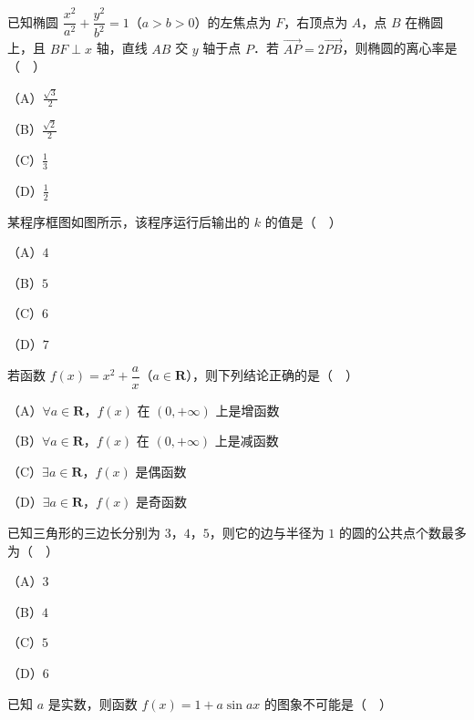 \begin{question}
已知椭圆 $\dfrac{x^2}{a^2}+\dfrac{y^2}{b^2}=1$（$a>b>0$）的左焦点为 $F$，右顶点为 $A$，点 $B$ 在椭圆上，且 $BF\perp x$ 轴，直线 $AB$ 交 $y$ 轴于点 $P$．若 $\overrightarrow{AP}=2\overrightarrow{PB}$，则椭圆的离心率是（　）

（A）$\frac{\sqrt3}{2}$

（B）$\frac{\sqrt2}{2}$

（C）$\frac13$

（D）$\frac12$

\Needspace{0.4\textheight}
\end{question}
\begingroup
\renewenvironment{question}{\Needspace{0.5\textheight}}{}
\begin{question}
某程序框图如图所示，该程序运行后输出的 $k$ 的值是（　）

（A）$4$

（B）$5$

（C）$6$

（D）$7$
\nopagebreak[4]
\begin{center}\end{center}
\nopagebreak[4]
\end{question}
\endgroup
\begin{question}
若函数 $f(x)=x^2+\dfrac ax$（$a\in\mathbf R$），则下列结论正确的是（　）

（A）$\forall a\in\mathbf R$，$f(x)$ 在 $(0,+\infty)$ 上是增函数

（B）$\forall a\in\mathbf R$，$f(x)$ 在 $(0,+\infty)$ 上是减函数

（C）$\exists a\in\mathbf R$，$f(x)$ 是偶函数

（D）$\exists a\in\mathbf R$，$f(x)$ 是奇函数

\end{question}
\begin{question}
已知三角形的三边长分别为 $3$，$4$，$5$，则它的边与半径为 $1$ 的圆的公共点个数最多为（　）

（A）$3$

（B）$4$

（C）$5$

（D）$6$

\Needspace{0.4\textheight}
\end{question}
\begingroup
\renewenvironment{question}{\Needspace{0.5\textheight}}{}
\begin{question}
已知 $a$ 是实数，则函数 $f(x)=1+a\sin ax$ 的图象不可能是（　）
\nopagebreak[4]
\begin{center}\end{center}
\nopagebreak[4]
\end{question}
\endgroup
{}

